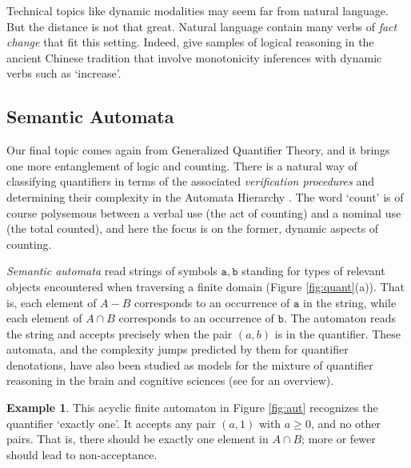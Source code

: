 \documentclass[12pt,oneside,reqno]{amsart}
\theoremstyle{definition}
\newtheorem{example}{Example}
\begin{document}
Technical topics like dynamic modalities may seem far from natural language. But the distance is not that great. Natural language contain many verbs of \emph{fact change} that fit this setting. Indeed, \cite{LiuMonotone} give samples of logical reasoning in the ancient Chinese tradition 
that involve monotonicity inferences with dynamic verbs  such as  `increase'. 

\subsection{Semantic Automata} \label{section:automata}
Our final topic comes again from Generalized Quantifier Theory, and it brings one more entanglement of logic and counting. There is a natural way of classifying quantifiers in terms of the associated \emph{verification procedures} and determining their complexity in the Automata Hierarchy \citep{vanBenthem1985}. The word `count' is of course polysemous between a verbal use (the act of counting) and a nominal use (the total counted), and here the focus is on the former, dynamic aspects of counting. 


 \emph{Semantic automata} read strings of symbols $\mathtt{a}, \mathtt{b}$ standing for types of relevant objects encountered when traversing a finite domain (Figure \ref{fig:quant}(a)). That is, each element of $A-B$ corresponds to an occurrence of $\mathtt{a}$ in the string, while each element of $A \cap B$ corresponds to an occurrence of $\mathtt{b}$. The automaton reads the string and accepts precisely when the pair $(a,b)$ is in the quantifier. These automata, and the complexity jumps predicted by them for quantifier denotations, have also been studied as models for the mixture of quantifier reasoning in the brain and cognitive sciences (see \citealt{Szymanik} for an overview).  
 
 
 \begin{example} This acyclic finite automaton in Figure \ref{fig:aut} recognizes the quantifier `exactly one'. It accepts any pair $(a,1)$ with $a\geq 0$, and no other pairs. That is, there should be exactly one element in $A \cap B$; more or fewer should lead to non-acceptance. \end{example}
 
 
\end{document}
